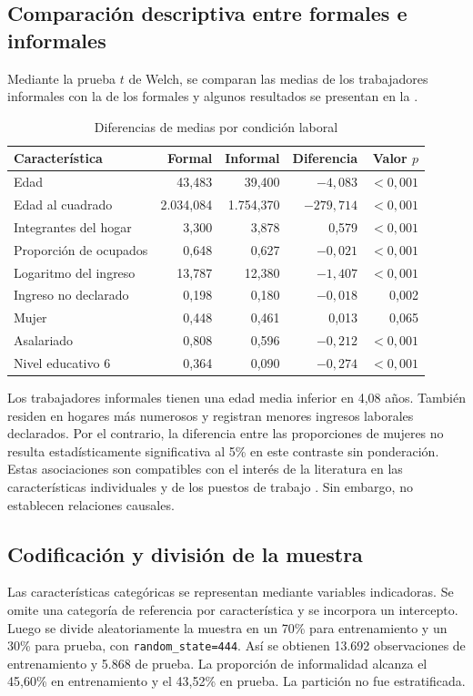 \subsection{Comparación descriptiva entre formales e informales}
Mediante la prueba $t$ de Welch, se comparan las medias de los trabajadores informales con la de los formales y algunos resultados se presentan en la .
\begin{table}[htbp]
\centering
\caption{Diferencias de medias por condición laboral}
\label{tab:medias_parte01}
\footnotesize
\begin{tabular}{lrrrr}
\hline
\textbf{Característica} & \textbf{Formal} & \textbf{Informal} & \textbf{Diferencia} & \textbf{Valor $p$} \\
\hline
Edad & 43,483 & 39,400 & $-4,083$ & $<0{,}001$ \\
Edad al cuadrado & 2.034,084 & 1.754,370 & $-279,714$ & $<0{,}001$ \\
Integrantes del hogar & 3,300 & 3,878 & 0,579 & $<0{,}001$ \\
Proporción de ocupados & 0,648 & 0,627 & $-0,021$ & $<0{,}001$ \\
Logaritmo del ingreso & 13,787 & 12,380 & $-1,407$ & $<0{,}001$ \\
Ingreso no declarado & 0,198 & 0,180 & $-0,018$ & 0,002 \\
Mujer & 0,448 & 0,461 & 0,013 & 0,065 \\
Asalariado & 0,808 & 0,596 & $-0,212$ & $<0{,}001$ \\
Nivel educativo 6 & 0,364 & 0,090 & $-0,274$ & $<0{,}001$ \\
\hline
\end{tabular}
\end{table}
Los trabajadores informales tienen una edad media inferior en 4,08 años. También residen en hogares más numerosos y registran menores ingresos laborales declarados. Por el contrario, la diferencia entre las proporciones de mujeres no resulta estadísticamente significativa al 5\% en este contraste sin ponderación. Estas asociaciones son compatibles con el interés de la literatura en las características individuales y de los puestos de trabajo \citep{formichella2008,ludmer2020}. Sin embargo, no establecen relaciones causales.

\subsection{Codificación y división de la muestra}
Las características categóricas se representan mediante variables indicadoras. Se omite una categoría de referencia por característica y se incorpora un intercepto. Luego se divide aleatoriamente la muestra en un 70\% para entrenamiento y un 30\% para prueba, con \texttt{random\_state=444}. Así se obtienen 13.692 observaciones de entrenamiento y 5.868 de prueba. La proporción de informalidad alcanza el 45,60\% en entrenamiento y el 43,52\% en prueba. La partición no fue estratificada.

